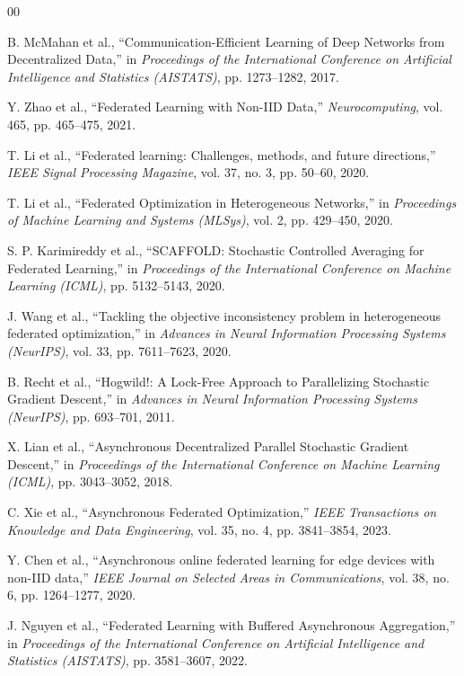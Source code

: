 \documentclass[conference]{IEEEtran}
\begin{document}
\begin{thebibliography}{00}

 B. McMahan et al., ``Communication-Efficient Learning of Deep Networks from Decentralized Data,'' in \textit{Proceedings of the International Conference on Artificial Intelligence and Statistics (AISTATS)}, pp. 1273--1282, 2017.

 Y. Zhao et al., ``Federated Learning with Non-IID Data,'' \textit{Neurocomputing}, vol. 465, pp. 465--475, 2021.

 T. Li et al., ``Federated learning: Challenges, methods, and future directions,'' \textit{IEEE Signal Processing Magazine}, vol. 37, no. 3, pp. 50--60, 2020.

 T. Li et al., ``Federated Optimization in Heterogeneous Networks,'' in \textit{Proceedings of Machine Learning and Systems (MLSys)}, vol. 2, pp. 429--450, 2020.

 S. P. Karimireddy et al., ``SCAFFOLD: Stochastic Controlled Averaging for Federated Learning,'' in \textit{Proceedings of the International Conference on Machine Learning (ICML)}, pp. 5132--5143, 2020.

 J. Wang et al., ``Tackling the objective inconsistency problem in heterogeneous federated optimization,'' in \textit{Advances in Neural Information Processing Systems (NeurIPS)}, vol. 33, pp. 7611--7623, 2020.

 B. Recht et al., ``Hogwild!: A Lock-Free Approach to Parallelizing Stochastic Gradient Descent,'' in \textit{Advances in Neural Information Processing Systems (NeurIPS)}, pp. 693--701, 2011.

 X. Lian et al., ``Asynchronous Decentralized Parallel Stochastic Gradient Descent,'' in \textit{Proceedings of the International Conference on Machine Learning (ICML)}, pp. 3043--3052, 2018.

 C. Xie et al., ``Asynchronous Federated Optimization,'' \textit{IEEE Transactions on Knowledge and Data Engineering}, vol. 35, no. 4, pp. 3841--3854, 2023.

 Y. Chen et al., ``Asynchronous online federated learning for edge devices with non-IID data,'' \textit{IEEE Journal on Selected Areas in Communications}, vol. 38, no. 6, pp. 1264--1277, 2020.

 J. Nguyen et al., ``Federated Learning with Buffered Asynchronous Aggregation,'' in \textit{Proceedings of the International Conference on Artificial Intelligence and Statistics (AISTATS)}, pp. 3581--3607, 2022.


\end{thebibliography}
\end{document}
